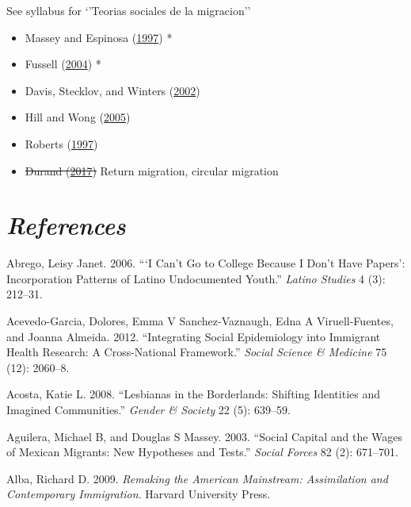\documentclass[
]{article}
\providecommand{\tightlist}{%
  \setlength{\itemsep}{0pt}\setlength{\parskip}{0pt}}
\begin{document}
See syllabus for `'Teorias sociales de la migracion''

\begin{itemize}
\tightlist
\item
  Massey and Espinosa (\protect\hyperlink{ref-massey1997s}{1997}) *
\item
  Fussell (\protect\hyperlink{ref-fussell2004sources}{2004}) *
\item
  Davis, Stecklov, and Winters
  (\protect\hyperlink{ref-davis2002domestic}{2002})
\item
  Hill and Wong (\protect\hyperlink{ref-hill2005mexico}{2005})
\item
  Roberts (\protect\hyperlink{ref-roberts1997china}{1997})
\item
  \sout{Durand (\protect\hyperlink{ref-durand2017}{2017})} Return
  migration, circular migration
\end{itemize}

\hypertarget{references}{%
\section*{\texorpdfstring{\emph{References}}{References}}\label{references}}

\hypertarget{refs}{}
\leavevmode\hypertarget{ref-abrego2006can}{}%
Abrego, Leisy Janet. 2006. ```I Can't Go to College Because I Don't Have
Papers': Incorporation Patterns of Latino Undocumented Youth.''
\emph{Latino Studies} 4 (3): 212--31.

\leavevmode\hypertarget{ref-acevedo2012integrating}{}%
Acevedo-Garcia, Dolores, Emma V Sanchez-Vaznaugh, Edna A
Viruell-Fuentes, and Joanna Almeida. 2012. ``Integrating Social
Epidemiology into Immigrant Health Research: A Cross-National
Framework.'' \emph{Social Science \& Medicine} 75 (12): 2060--8.

\leavevmode\hypertarget{ref-acosta2008lesbianas}{}%
Acosta, Katie L. 2008. ``Lesbianas in the Borderlands: Shifting
Identities and Imagined Communities.'' \emph{Gender \& Society} 22 (5):
639--59.

\leavevmode\hypertarget{ref-aguilera2003social}{}%
Aguilera, Michael B, and Douglas S Massey. 2003. ``Social Capital and
the Wages of Mexican Migrants: New Hypotheses and Tests.'' \emph{Social
Forces} 82 (2): 671--701.

\leavevmode\hypertarget{ref-alba2009remaking}{}%
Alba, Richard D. 2009. \emph{Remaking the American Mainstream:
Assimilation and Contemporary Immigration}. Harvard University Press.
\end{document}
